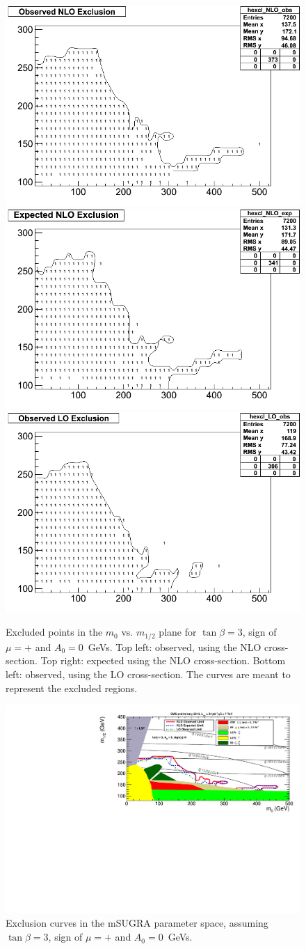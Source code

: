 \begin{figure}[tbh]
\begin{center}
\includegraphics[width=0.4\linewidth]{tanbeta3_NLO_observed.png}
\includegraphics[width=0.4\linewidth]{tanbeta3_NLO_expected.png}
\includegraphics[width=0.4\linewidth]{tanbeta3_LO_observed.png}
\caption{\label{fig:tanbeta3raw}\protect Excluded points in the 
$m_0$ vs. $m_{1/2}$ plane for $\tan\beta=3$, sign of $\mu = +$ and $A_{0}=0$~GeVs. 
Top left: observed, using the NLO cross-section.
Top right: expected using the NLO cross-section.
Bottom left: observed, using the LO cross-section.
The curves are meant to represent the excluded regions.}
\end{center}
\end{figure}


\begin{figure}[tbh]
\begin{center}
\includegraphics[width=\linewidth]{exclusion.pdf}
\caption{\label{fig:msugra}\protect Exclusion curves in the mSUGRA parameter space, 
assuming $\tan\beta=3$, sign of $\mu = +$ and $A_{0}=0$~GeVs.}  
\end{center}
\end{figure}



